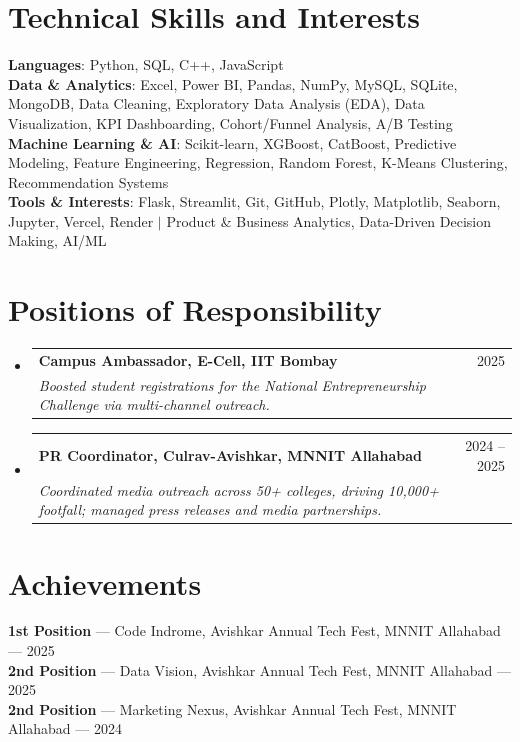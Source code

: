 \documentclass[letterpaper,10pt]{article} %
\makeatletter
\newcommand{\resumeSubheading}[4]{
  \vspace{-2pt}\item
    \begin{tabular*}{0.97\textwidth}[t]{l@{\extracolsep{\fill}}r}
      \textbf{#1} & #2 \\
      \textit{\small#3} & \textit{\small #4} \\
    \end{tabular*}\vspace{-7pt}
}
\newcommand{\resumeSubHeadingListStart}{\begin{itemize}[leftmargin=0.15in, label={}]}
\newcommand{\resumeSubHeadingListEnd}{\end{itemize}}
\makeatother
\begin{document}
\section{Technical Skills and Interests}
 \begin{itemize}[leftmargin=0.15in, label={}]\vspace{-5pt}
    \small{\item{
     \textbf{Languages}{: Python, SQL, C++, JavaScript} \\ \vspace{-1.5pt}
     \textbf{Data \& Analytics}{: Excel, Power BI, Pandas, NumPy, MySQL, SQLite, MongoDB, Data Cleaning, Exploratory Data Analysis (EDA), Data Visualization, KPI Dashboarding, Cohort/Funnel Analysis, A/B Testing} \\ \vspace{-1.5pt}
     \textbf{Machine Learning \& AI}{: Scikit-learn, XGBoost, CatBoost, Predictive Modeling, Feature Engineering, Regression, Random Forest, K-Means Clustering, Recommendation Systems} \\ \vspace{-1.5pt}
     \textbf{Tools \& Interests}{: Flask, Streamlit, Git, GitHub, Plotly, Matplotlib, Seaborn, Jupyter, Vercel, Render $|$ Product & Business Analytics, Data-Driven Decision Making, AI/ML}
    }}
 \end{itemize}

\section{Positions of Responsibility}
  \resumeSubHeadingListStart
    \resumeSubheading
      {Campus Ambassador, E-Cell, IIT Bombay}{2025}
      {Boosted student registrations for the National Entrepreneurship Challenge via multi-channel outreach.}{}
    \resumeSubheading
      {PR Coordinator, Culrav-Avishkar, MNNIT Allahabad}{2024 -- 2025}
      {Coordinated media outreach across 50+ colleges, driving 10,000+ footfall; managed press releases and media partnerships.}{}
  \resumeSubHeadingListEnd

\vspace{7pt} %
\section{Achievements}
  \resumeSubHeadingListStart
    \small{\item[] \vspace{2pt}
      \textbf{1st Position} --- Code Indrome, Avishkar Annual Tech Fest, MNNIT Allahabad --- 2025 \\
      \textbf{2nd Position} --- Data Vision, Avishkar Annual Tech Fest, MNNIT Allahabad --- 2025 \\
      \textbf{2nd Position} --- Marketing Nexus, Avishkar Annual Tech Fest, MNNIT Allahabad --- 2024
    }
  \resumeSubHeadingListEnd
\end{document}
